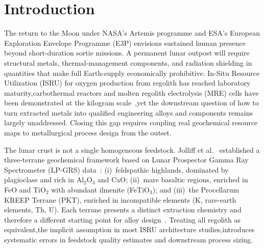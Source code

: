 \documentclass[11pt,a4paper]{article}
\begin{document}
\section{Introduction}

The return to the Moon under NASA's Artemis programme and ESA's European Exploration Envelope Programme (E3P) envisions sustained human presence beyond short-duration sortie missions. A permanent lunar outpost will require structural metals, thermal-management components, and radiation shielding in quantities that make full Earth-supply economically prohibitive. In-Situ Resource Utilization (ISRU) for oxygen production from regolith has reached laboratory maturity,carbothermal reactors and molten regolith electrolysis (MRE) cells have been demonstrated at the kilogram scale~\cite{Sanders2013,Sanders2025},yet the downstream question of how to turn extracted metals into qualified engineering alloys and components remains largely unaddressed. Closing this gap requires coupling real geochemical resource maps to metallurgical process design from the outset.

The lunar crust is not a single homogeneous feedstock. Jolliff et al.~\cite{Jolliff2000} established a three-terrane geochemical framework based on Lunar Prospector Gamma Ray Spectrometer (LP-GRS) data~\cite{Prettyman2006}: (i)~feldspathic highlands, dominated by plagioclase and rich in Al$_2$O$_3$ and CaO; (ii)~mare basaltic regions, enriched in FeO and TiO$_2$ with abundant ilmenite (FeTiO$_3$); and (iii)~the Procellarum KREEP Terrane (PKT), enriched in incompatible elements (K, rare-earth elements, Th, U). Each terrane presents a distinct extraction chemistry and therefore a different starting point for alloy design~\cite{Taylor2009,Lucey2006}. Treating all regolith as equivalent,the implicit assumption in most ISRU architecture studies,introduces systematic errors in feedstock quality estimates and downstream process sizing.
\end{document}
